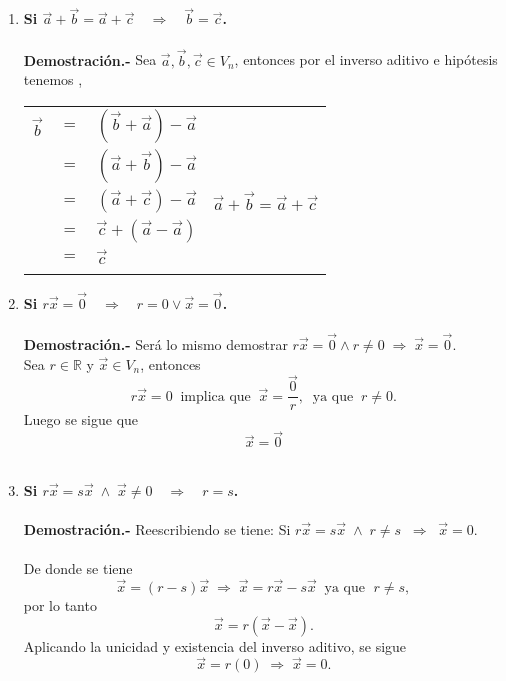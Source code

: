 \begin{enumerate}
\begin{enumerate}[\bfseries a)]
    \item \textbf{\boldmath Si $\vec{a}+\vec{b}=\vec{a}+\vec{c} \quad \Rightarrow \quad \vec{b}=\vec{c}$.\\\\
	Demostración.-}\; Sea $\vec{a},\vec{b},\vec{c} \in V_n$, entonces por el inverso aditivo e hipótesis tenemos ,
	\begin{center}
	    \begin{tabular}{rcl|l}
		$\vec{b}$&$=$&$(\vec{b}+\vec{a})-\vec{a}$&\\
			 &$=$&$(\vec{a}+\vec{b})-\vec{a}$&\\
			 &$=$&$(\vec{a}+\vec{c})-\vec{a}$&$\vec{a}+\vec{b}=\vec{a}+\vec{c}$\\
			 &$=$&$\vec{c}+(\vec{a}-\vec{a})$&\\
		&$=$&$\vec{c}$\\\\
	    \end{tabular}
	\end{center}
	\vspace{0.5cm}

    \item \textbf{\boldmath Si $r\vec{x}=\vec{0}\quad \Rightarrow \quad r=0 \lor \vec{x}=\vec{0}$.\\\\
	Demostración.-}\; Será lo mismo demostrar $r\vec{x}=\vec{0}  \land r\neq 0\;\Rightarrow\;\vec{x}=\vec{0}$.\\ 

	Sea $r\in \mathbb{R}$ y $\vec{x} \in V_n$, entonces $$r\vec{x}=0 \;\; \mbox{implica que}\;\;  \vec{x}=\dfrac{\vec{0}}{r}, \;\; \mbox{ya que}\;\; r\neq 0.$$ Luego se sigue que $$\vec{x}=\vec{0}$$\\

    \item \textbf{\boldmath Si $r\vec{x}=s\vec{x}\;\land\; \vec{x}\neq 0 \quad \Rightarrow \quad r=s$.\\\\
	Demostración.-}\; Reescribiendo se tiene: Si $r\vec{x}=s\vec{x}\; \land \; r\neq s \;\; \Rightarrow \; \; \vec{x}=0$.\\\\ 
	De donde se tiene $$\vec{x}=(r-s)\vec{x} \; \Rightarrow \; \vec{x}=r\vec{x}-s\vec{x} \; \; \mbox{ya que }\; r\neq s,$$ 
	por lo tanto $$\vec{x}=r(\vec{x}-\vec{x}).$$
	Aplicando la unicidad y existencia del inverso aditivo, se sigue 
	$$\vec{x}=r(0) \; \Rightarrow \; \vec{x}=0.$$\\


\end{enumerate}
\end{enumerate}
